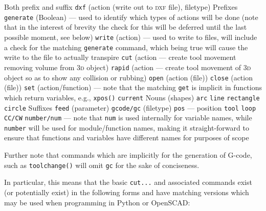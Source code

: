 \documentclass{ltxdoc}
\begin{document}
\begin{outline}
\1 Both prefix and suffix
\2 \texttt{dxf} (action (write out to \textsc{dxf} file), filetype)
\1 Prefixes
\2 \texttt{generate} (Boolean) --- used to identify which types of actions will be done (note that in the interest of brevity the check for this will be deferred until the last possible moment, see below)
\2 \texttt{write} (action) --- used to write to files, will include a check for the matching \texttt{generate} command, which being true will cause the write to the file to actually transpire 
\2 \texttt{cut} (action --- create tool movement removing volume from \textsc{3d} object)
\2 \texttt{rapid} (action --- create tool movement of \textsc{3d} object so as to show any collision or rubbing)
\2 \texttt{open} (action (file))
\2 \texttt{close} (action (file))
\2 \texttt{set} (action/function) --- note that the matching \verb|get| is implicit in functions which return variables, e.g., \verb|xpos()|
\2 \texttt{current}
\1 Nouns (shapes)
\2 \texttt{arc}
\2 \texttt{line}
\2 \texttt{rectangle}
\2 \texttt{circle}
\1 Suffixes
\2 \texttt{feed} (parameter)
\2 \texttt{gcode/gc} (filetype)
\2 \texttt{pos} --- position
\2 \texttt{tool}
\2 \texttt{loop}
\2 \texttt{CC/CW}
\2 \texttt{number/num} --- note that \verb|num| is used internally for variable names, while \verb|number| will be used for module/function names, making it straight-forward to ensure that functions and variables have different names for purposes of scope
\end{outline}

\noindent Further note that commands which are implicitly for the generation of G-code, such as \verb|toolchange()| will omit \verb|gc| for the sake of conciseness.

In particular, this means that the basic \verb|cut...| and associated commands exist (or potentially exist) in the following forms and have matching versions which may be used when programming in Python or OpenSCAD:
\end{document}
